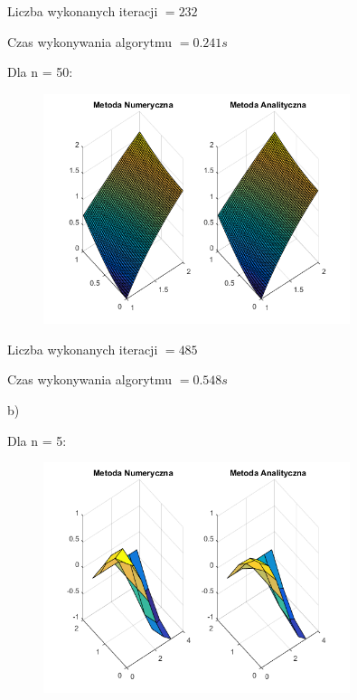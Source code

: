 Liczba wykonanych iteracji $ = 232 $

Czas wykonywania algorytmu $ = 0.241 s$

Dla n = 50:

\begin{figure}[!ht]
	\begin{center}
		\includegraphics[width=0.8\textwidth]{Lab6/charts/gs/zad1/50.png}
	\end{center}
\end{figure}

Liczba wykonanych iteracji $ = 485 $

Czas wykonywania algorytmu $ = 0.548 s$

b)

Dla n = 5:

\begin{figure}[!ht]
	\begin{center}
		\includegraphics[width=0.8\textwidth]{Lab6/charts/gs/zad2/5.png}
	\end{center}
\end{figure}

